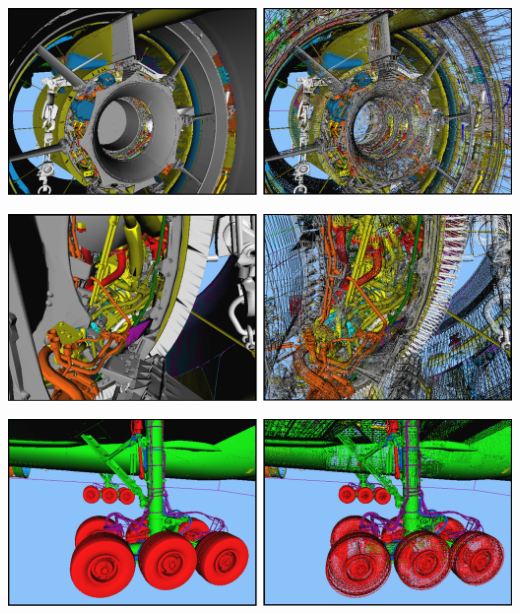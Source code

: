 \begin{Bild}
\includegraphics[scale=0.40]{images/turbine_innen.pdf}
\end{Bild}
\vspace{0.9cm}
\begin{Bild}
\includegraphics[scale=0.40]{images/turbine_innen2.pdf}
\end{Bild}
\vspace{0.9cm}
\begin{Bild}
\includegraphics[scale=0.40]{images/fahrwerk.pdf}
\end{Bild}

%
%

